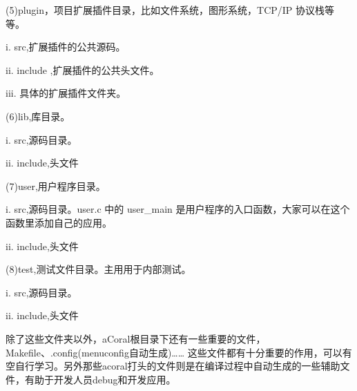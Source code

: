 (5)plugin，项目扩展插件目录，比如文件系统，图形系统，TCP/IP 协议栈等等。

	\chinesespace i. src,扩展插件的公共源码。

	\chinesespace ii. include ,扩展插件的公共头文件。

	\chinesespace iii. 具体的扩展插件文件夹。

(6)lib,库目录。

	\chinesespace i. src,源码目录。

	\chinesespace ii. include,头文件

(7)user,用户程序目录。

	\chinesespace i. src,源码目录。user.c 中的 user\_main 是用户程序的入口函数，大家可以在这个函数里添加自己的应用。

	\chinesespace ii. include,头文件

(8)test,测试文件目录。主用用于内部测试。

	\chinesespace i. src,源码目录。

	\chinesespace ii. include,头文件

除了这些文件夹以外，aCoral根目录下还有一些重要的文件，Makefile、.config(menuconfig自动生成)……
这些文件都有十分重要的作用，可以有空自行学习。另外那些acoral打头的文件则是在编译过程中自动生成的一些辅助文件，有助于开发人员debug和开发应用。
